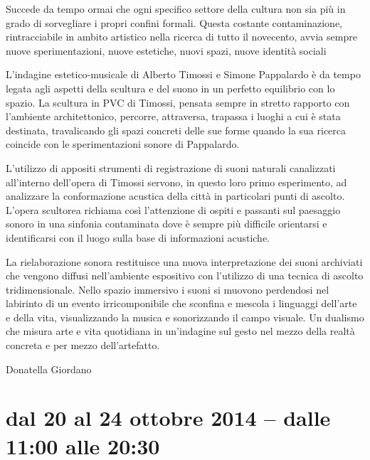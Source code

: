 \documentclass[9pt, twoside, a5paper]{extreport}
\begin{document}
\bigskip

\begin{multicols}{2}

\noindent Succede da tempo ormai che ogni specifico settore della cultura non sia più in grado di sorvegliare i propri confini formali. Questa costante contaminazione, rintracciabile in ambito artistico nella ricerca di tutto il novecento, avvia sempre nuove sperimentazioni, nuove estetiche, nuovi spazi, nuove identità sociali

L'indagine estetico-musicale di Alberto Timossi e Simone Pappalardo è da tempo legata agli aspetti della scultura e del suono in un perfetto equilibrio con lo spazio. La scultura in PVC di Timossi, pensata sempre in stretto rapporto con l'ambiente architettonico, percorre, attraversa, trapassa i luoghi a cui è stata destinata, travalicando gli spazi concreti delle sue forme quando la sua ricerca coincide con le sperimentazioni sonore di Pappalardo.

L'utilizzo di appositi strumenti di registrazione di suoni naturali canalizzati all'interno dell'opera di Timossi servono, in questo loro primo esperimento, ad analizzare la conformazione acustica della città in particolari punti di ascolto. L'opera scultorea richiama così l'attenzione di ospiti e passanti sul paesaggio sonoro in una sinfonia contaminata dove è sempre più difficile orientarsi e identificarsi con il luogo sulla base di informazioni acustiche.

La rielaborazione sonora restituisce una nuova interpretazione dei suoni archiviati che vengono diffusi nell'ambiente espositivo con l'utilizzo di una tecnica di ascolto tridimensionale. Nello spazio immersivo i suoni si muovono perdendosi nel labirinto di un evento irricomponibile che sconfina e mescola i linguaggi dell'arte e della vita, visualizzando la musica e sonorizzando il campo visuale. Un dualismo che misura arte e vita quotidiana in un'indagine sul gesto nel mezzo della realtà concreta e per mezzo dell'artefatto.

\hfill{Donatella Giordano}

\end{multicols}


\clearpage

\section*{dal 20 al 24 ottobre 2014 -- dalle 11:00 alle 20:30}
\end{document}
